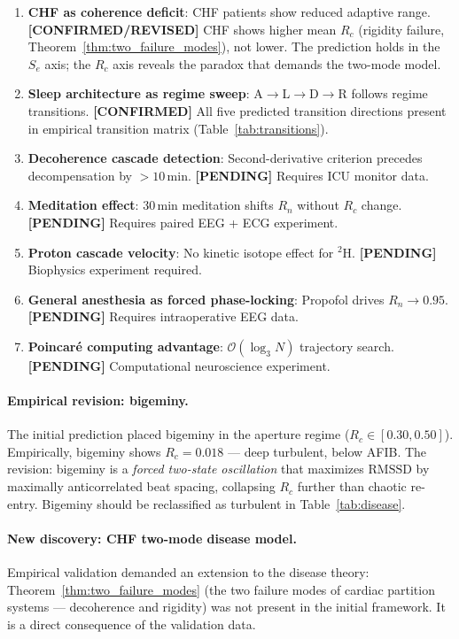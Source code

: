 \documentclass[12pt,a4paper]{article}
\theoremstyle{definition}
\begin{document}
\begin{enumerate}
\item \textbf{CHF as coherence deficit}: CHF patients show reduced adaptive range.
  \textbf{[CONFIRMED/REVISED]} CHF shows higher mean $R_c$ (rigidity failure,
  Theorem~\ref{thm:two_failure_modes}), not lower. The prediction holds in the
  $S_e$ axis; the $R_c$ axis reveals the paradox that demands the two-mode model.

\item \textbf{Sleep architecture as regime sweep}: A$\to$L$\to$D$\to$R follows
  regime transitions. \textbf{[CONFIRMED]} All five predicted transition directions
  present in empirical transition matrix (Table~\ref{tab:transitions}).

\item \textbf{Decoherence cascade detection}: Second-derivative criterion precedes
  decompensation by $> 10$\,min. \textbf{[PENDING]} Requires ICU monitor data.

\item \textbf{Meditation effect}: 30\,min meditation shifts $R_n$ without $R_c$ change.
  \textbf{[PENDING]} Requires paired EEG + ECG experiment.

\item \textbf{Proton cascade velocity}: No kinetic isotope effect for $^2$H.
  \textbf{[PENDING]} Biophysics experiment required.

\item \textbf{General anesthesia as forced phase-locking}: Propofol drives
  $R_n \to 0.95$. \textbf{[PENDING]} Requires intraoperative EEG data.

\item \textbf{Poincaré computing advantage}: $\mathcal{O}(\log_3 N)$ trajectory search.
  \textbf{[PENDING]} Computational neuroscience experiment.
\end{enumerate}

\paragraph{Empirical revision: bigeminy.}
The initial prediction placed bigeminy in the aperture regime ($R_c \in [0.30, 0.50]$).
Empirically, bigeminy shows $R_c = 0.018$ --- deep turbulent, below AFIB.
The revision: bigeminy is a \emph{forced two-state oscillation} that maximizes
$\mathrm{RMSSD}$ by maximally anticorrelated beat spacing, collapsing $R_c$
further than chaotic re-entry. Bigeminy should be reclassified as turbulent
in Table~\ref{tab:disease}.

\paragraph{New discovery: CHF two-mode disease model.}
Empirical validation demanded an extension to the disease theory: Theorem~\ref{thm:two_failure_modes}
(the two failure modes of cardiac partition systems --- decoherence and rigidity)
was not present in the initial framework. It is a direct consequence of the validation data.
\end{document}

